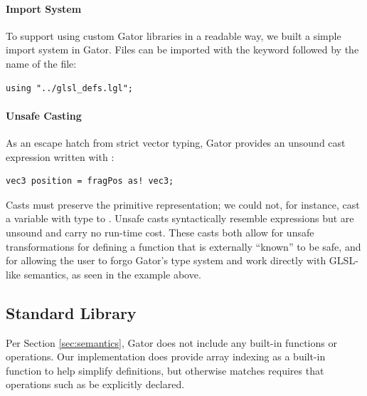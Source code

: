 {\paragraph{Import System}
To support using custom Gator libraries in a readable way, we built a simple import system in Gator.  Files can be imported with the keyword  followed by the name of the file:
%
\begin{lstlisting}
using "../glsl_defs.lgl";
\end{lstlisting}
%
\paragraph{Unsafe Casting}
As an escape hatch from strict vector typing, Gator provides an unsound cast expression written with :
%
\begin{lstlisting}
vec3 position = fragPos as! vec3;
\end{lstlisting}
%
Casts must preserve the primitive representation; we could not, for instance, cast a variable with type  to .
Unsafe casts syntactically resemble  expressions but are unsound and carry no run-time cost.
These casts both allow for unsafe transformations for defining a function that is externally ``known'' to be safe, and for allowing the user to forgo Gator's type system and work directly with GLSL-like semantics, as seen in the example above.

\subsection{Standard Library}
Per Section \ref{sec:semantics}, Gator does not include any built-in functions or operations.  Our implementation does provide array indexing as a built-in function to help simplify definitions, but otherwise matches requires that operations such as \code{+} be explicitly declared.

}
